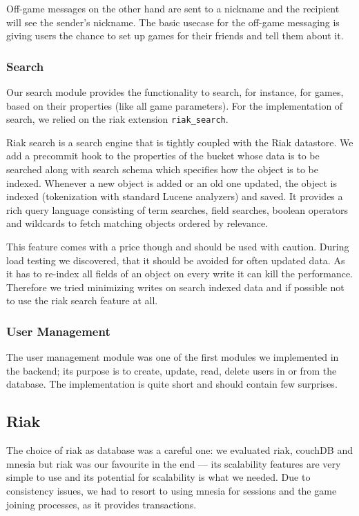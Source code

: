 \documentclass[11pt,a4paper]{report}
\begin{document}
Off-game messages on the other hand are sent to a nickname and the recipient
will see the sender's nickname. The basic usecase for the off-game messaging is
giving users the chance to set up games for their friends and tell them about
it.
\subsubsection{Search}
Our search module provides the functionality to search, for instance, for games,
based on their properties (like all game parameters). For the implementation of
search, we relied on the riak extension {\tt riak\_search}.

Riak search is a search engine that is tightly coupled with the Riak datastore.
We add a precommit hook to the properties of the bucket whose data is to be
searched along with search schema which specifies how the object is to be indexed.
Whenever a new object is added or an old one updated, the object is indexed
(tokenization with standard Lucene analyzers) and saved.
It provides a rich query language consisting of term searches, field searches,
boolean operators and wildcards to fetch matching objects ordered by relevance.

This feature comes with a price though and should be used with caution.
During load testing we discovered, that it should be avoided for often updated data.
As it has to re-index all fields of an object on every write it can kill the performance.
Therefore we tried minimizing writes on search indexed data and if possible not
to use the riak search feature at all.

\subsubsection{User Management}
The user management module was one of the first modules we implemented in the
backend; its purpose is to create, update, read, delete users in or from the
database. The implementation is quite short and should contain few surprises.

\subsection{Riak}
The choice of riak as database was a careful one: we evaluated riak, couchDB
and mnesia but riak was our favourite in the end --- its scalability features
are very simple to use and its potential for scalability is what we needed.
Due to consistency issues, we had to resort to using mnesia for sessions and
the game joining processes, as it provides transactions.
\end{document}
